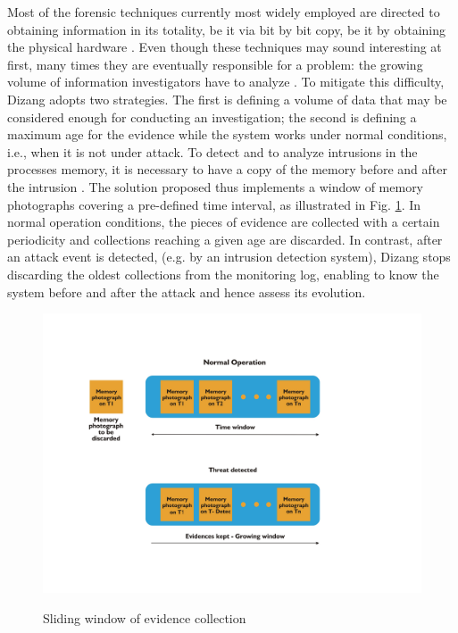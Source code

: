 \documentclass[conference]{IEEEtran}
\newcommand{\fancyname}{Dizang }
\begin{document}
Most of the forensic techniques currently most widely employed are directed to obtaining information in its totality, be it via bit by bit copy, be it by obtaining the physical hardware \cite{Simou_Cloud_Chlng:2014} \cite{Bem_Past_Present_Future:2008}. 
%
Even though these techniques may sound interesting at first, many times they are eventually responsible for a problem: the growing volume of information investigators have to analyze \cite{Quick_Increase_Volume_Impact:2014}.
%
To mitigate this difficulty, \fancyname adopts two strategies. The first is defining a volume of data that may be considered enough for conducting an investigation; the second is defining a maximum age for the evidence while the system works under normal conditions, i.e., when it is not under attack.
%
To detect and to analyze intrusions in the processes memory, it is necessary to have a copy of the memory before and after the intrusion \cite{Case_Memory_Forensics:2014}. 
%
The solution proposed thus implements a window of memory photographs covering a pre-defined time interval, as illustrated in Fig. \ref{fig:janela}. 
%
In normal operation conditions, the pieces of evidence are collected with a certain periodicity and collections reaching a given age are discarded.
%
In contrast, after an attack event is detected, (e.g. by an intrusion detection system), \fancyname stops discarding the oldest collections from the monitoring log, enabling to know the system before and after the attack and hence assess its evolution.
%

\begin{figure}[htb!]
\footnotesize
\caption{Sliding window of evidence collection}
\includegraphics[scale=0.40]{janela_ieee-eng.jpg}
\centering
\label{fig:janela}
\end{figure}
\end{document}
